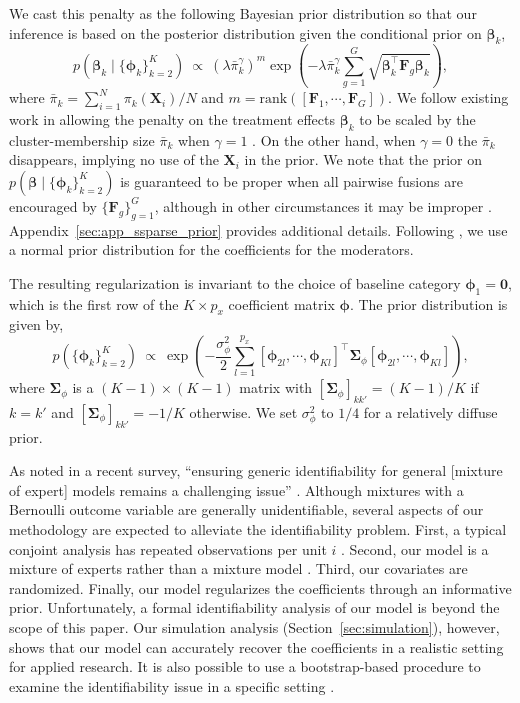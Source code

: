 \documentclass[11pt]{article}
\newcommand\bF{\bm{F}}
\newcommand\bX{\bm{X}}
\newcommand\bbeta{\bm{\beta}}
\newcommand\bphi{\bm{\phi}}
\begin{document}
We cast this penalty as the following Bayesian prior distribution so
that our inference is based on the posterior distribution given the conditional prior on $\bm{\beta}_k$,
\begin{equation}
\label{eq:prior_beta}
p\left(\bbeta_k \mid \{\bm{\phi}_k\}_{k=2}^K\right) \ \propto \ \left(\lambda {\bar{\pi}_k^\gamma}\right)^m \exp\left(-\lambda \bar{\pi}_k^\gamma \sum_{g=1}^{G} \sqrt{\bbeta_k^\top\bF_{g} \bbeta_k}\right), 
\end{equation}
where $\bar{\pi}_k = \sum_{i=1}^N \pi_k(\bX_i)/N$ and
$m = \text{rank}\left([\bF_{1}, \cdots, \bF_{G}]\right)$. We follow
existing work in allowing the penalty on the treatment effects
$\bm{\beta}_k$ to be scaled by the cluster-membership size
$\bar{\pi}_k$ when $\gamma = 1$
\citep{khal:chen:07,stadler2010lasso}.
On the other hand, when $\gamma = 0$ the $\bar{\pi}_k$ disappears, implying no use of the $\bX_i$ in the prior.
 We note that the prior on
$p(\bm{\beta} \mid \{\bm{\phi}_k\}_{k=2}^K)$ is guaranteed to be
proper when all pairwise fusions are encouraged by
$\{\bm{F}_g\}_{g=1}^G$, although in other circumstances it may be
improper
\citep{goplerud2021sparsity}.  Appendix~\ref{sec:app_ssparse_prior}
provides additional details. Following \cite{zahid2013ridge}, we use a
normal prior distribution for the coefficients for the moderators.

The resulting regularization is invariant to the choice of baseline
category $\bphi_1 = \bm{0}$, which is the first row of the
$K \times p_x$ coefficient matrix $\bphi$.  The prior distribution is
given by,
\begin{equation}
\label{eq:prior_phi}
p(\{\bm{\phi}_k\}_{k=2}^K) \ \propto \ \exp\left(-\frac{\sigma^2_\phi}{2}\sum_{l=1}^{p_x} [\bphi_{2l}, \cdots, \bphi_{Kl}]^\top \bm{\Sigma}_\phi [\bphi_{2l}, \cdots, \bphi_{Kl}]\right), 
\end{equation}
where $\bm{\Sigma}_\phi$ is a $(K-1) \times (K-1)$ matrix with
$[\bm{\Sigma}_\phi]_{kk'} = (K-1)/K$ if $k = k'$ and $[\bm{\Sigma}_\phi]_{kk'} =-1/K$
otherwise. We set $\sigma^2_\phi$ to $1/4$ for a relatively diffuse prior.

As noted in a recent survey, ``ensuring generic identifiability for general [mixture of expert] models remains a challenging issue'' \cite[p. 294]{gormley2019mixture}.  Although mixtures with a Bernoulli outcome variable are generally unidentifiable, several aspects of our methodology are expected to alleviate the identifiability problem. First, a typical conjoint analysis has repeated observations per unit $i$ \citep{grun2008multinomial}.  Second, our model is a mixture of experts rather than a mixture model \citep{jiang1999identifiability}.
Third, our covariates are randomized. Finally, our model regularizes the coefficients through an informative prior. Unfortunately, a formal identifiability analysis of our model is beyond the scope of this paper.  Our simulation analysis (Section~\ref{sec:simulation}), however, shows that our model can accurately recover the coefficients in a realistic setting for applied research. It is also possible to use a bootstrap-based procedure to examine the
identifiability issue in a specific setting
\citep{grun2008multinomial}.
\end{document}
